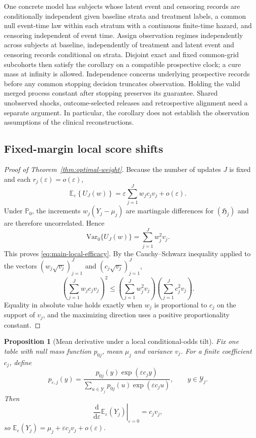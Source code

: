 \documentclass[12pt]{article}
\newtheorem{proposition}[theorem]{Proposition}
\theoremstyle{definition}
\theoremstyle{remark}
\begin{document}
One concrete model has subjects whose latent event and censoring records are conditionally independent given baseline strata and treatment labels, a common null event-time law within each stratum with a continuous finite-time hazard, and censoring independent of event time. Assign observation regimes independently across subjects at baseline, independently of treatment and latent event and censoring records conditional on strata. Disjoint exact and fixed common-grid subcohorts then satisfy the corollary on a compatible prospective clock; a cure mass at infinity is allowed. Independence concerns underlying prospective records before any common stopping decision truncates observation. Holding the valid merged process constant after stopping preserves its guarantee. Shared unobserved shocks, outcome-selected releases and retrospective alignment need a separate argument. In particular, the corollary does not establish the observation assumptions of the clinical reconstructions.

\subsection{Fixed-margin local score shifts}
\label{sec:local-weights}

\begin{proof}[Proof of Theorem~\ref{thm:optimal-weight}]
Because the number of updates $J$ is fixed and each $r_j(\varepsilon)=o(\varepsilon)$,
\[
 \mathbb E_\varepsilon\left\{U_J(w)\right\}
 =\varepsilon\sum_{j=1}^{J}w_jc_jv_j+o(\varepsilon).
\]
Under $\mathbb P_0$, the increments $w_j(Y_j-\mu_j)$ are martingale differences for $(\mathfrak H_j)$ and are therefore uncorrelated. Hence
\[
 \mathrm{Var}_0\{U_J(w)\}=\sum_{j=1}^{J}w_j^2v_j.
\]
This proves \eqref{eq:main-local-efficacy}. By the Cauchy--Schwarz inequality applied to the vectors $(w_j\sqrt{v_j})_{j=1}^J$ and $(c_j\sqrt{v_j})_{j=1}^J$,
\[
 \left(\sum_{j=1}^{J}w_jc_jv_j\right)^2
 \leq\left(\sum_{j=1}^{J}w_j^2v_j\right)
       \left(\sum_{j=1}^{J}c_j^2v_j\right).
\]
Equality in absolute value holds exactly when $w_j$ is proportional to $c_j$ on the support of $v_j$, and the maximizing direction uses a positive proportionality constant.
\end{proof}

\begin{proposition}[Mean derivative under a local conditional-odds tilt]
\label{prop:tilt-mean-derivative}
Fix one table with null mass function $p_{0j}$, mean $\mu_j$ and variance $v_j$. For a finite coefficient $c_j$, define
\[
 p_{\varepsilon,j}(y)=
 \frac{p_{0j}(y)\exp(\varepsilon c_jy)}
 {\sum_{u\in\mathcal Y_j}p_{0j}(u)\exp(\varepsilon c_ju)},
 \qquad y\in\mathcal Y_j.
\]
Then
\[
 \left.\frac{\mathrm d}{\mathrm d\varepsilon}
 \mathbb E_\varepsilon(Y_j)\right|_{\varepsilon=0}=c_jv_j,
\]
so $\mathbb E_\varepsilon(Y_j)=\mu_j+\varepsilon c_jv_j+o(\varepsilon)$.
\end{proposition}
\end{document}
